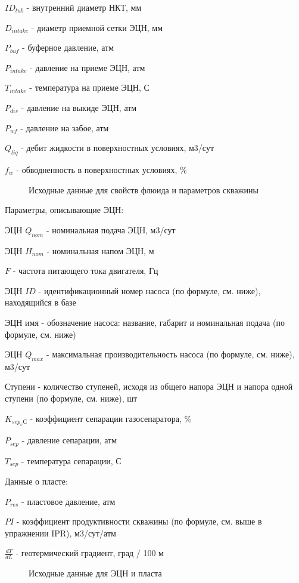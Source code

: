 $ID_{tub}$ - внутренний диаметр НКТ, мм

$D_{intake}$ - диаметр приемной сетки ЭЦН, мм

$P_{buf}$ - буферное давление, атм

$P_{intake}$ - давление на приеме ЭЦН, атм

$T_{intake}$ - температура на приеме ЭЦН, С

$P_{dis}$ - давление на выкиде ЭЦН, атм

$P_{wf}$ - давление на забое, атм

$Q_{liq}$ - дебит жидкости в поверхностных условиях, м3/сут

$f_w$ - обводненность в поверхностных условиях, \%

\begin{figure}[h!]
	\center{\texttt{[image: Ex70\_1]}}
	\caption{Исходные данные для свойств флюида и параметров скважины}
	\label{ris:Ex70_1}
\end{figure}

Параметры, описывающие ЭЦН: 

ЭЦН $Q_{nom}$ - номинальная подача ЭЦН, м3/сут

ЭЦН $H_{nom}$ - номинальная напом ЭЦН, м

$F$ - частота питающего тока двигателя, Гц

ЭЦН $ID$ - идентификационный номер насоса (по формуле, см. ниже), находящийся в базе \unf

ЭЦН имя - обозначение насоса: название, габарит и номинальная подача (по формуле, см. ниже)

ЭЦН $Q_{max}$ - максимальная производительность насоса (по формуле, см. ниже), м3/сут

Ступени - количество ступеней, исходя из общего напора ЭЦН и напора одной ступени (по формуле, см. ниже), шт

$K_{sep_ГС}$ - коэффициент сепарации газосепаратора, \%

$P_{sep}$ - давление сепарации, атм

$T_{sep}$ - температура сепарации, С

Данные о пласте:

$P_{res}$ - пластовое давление, атм

$PI$ - коэффициент продуктивности скважины (по формуле, см. выше в упражнении IPR), м3/сут/атм

$\frac{dT}{dL}$ - геотермический градиент, град / 100 м

\begin{figure}[h!]
	\center{\texttt{[image: Ex70\_2]}}
	\caption{Исходные данные для ЭЦН и пласта}
	\label{ris:Ex70_2}
\end{figure}

